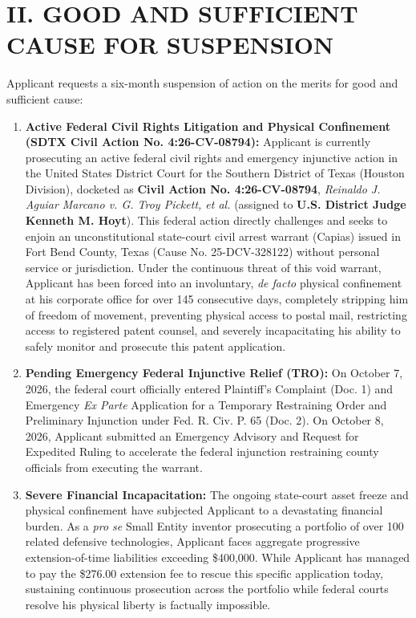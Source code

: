 \documentclass[11pt,letterpaper]{article}
\begin{document}
\section*{II. GOOD AND SUFFICIENT CAUSE FOR SUSPENSION}

Applicant requests a six-month suspension of action on the merits for good and sufficient cause:

\begin{enumerate}[leftmargin=2em, itemsep=3pt, parsep=0pt]
    \item \textbf{Active Federal Civil Rights Litigation and Physical Confinement (SDTX Civil Action No. 4:26-CV-08794):} Applicant is currently prosecuting an active federal civil rights and emergency injunctive action in the United States District Court for the Southern District of Texas (Houston Division), docketed as \textbf{Civil Action No. 4:26-CV-08794}, \textit{Reinaldo J. Aguiar Marcano v. G. Troy Pickett, et al.} (assigned to \textbf{U.S. District Judge Kenneth M. Hoyt}). This federal action directly challenges and seeks to enjoin an unconstitutional state-court civil arrest warrant (Capias) issued in Fort Bend County, Texas (Cause No. 25-DCV-328122) without personal service or jurisdiction. Under the continuous threat of this void warrant, Applicant has been forced into an involuntary, \textit{de facto} physical confinement at his corporate office for over 145 consecutive days, completely stripping him of freedom of movement, preventing physical access to postal mail, restricting access to registered patent counsel, and severely incapacitating his ability to safely monitor and prosecute this patent application.
    \item \textbf{Pending Emergency Federal Injunctive Relief (TRO):} On October 7, 2026, the federal court officially entered Plaintiff's Complaint (Doc. 1) and Emergency \textit{Ex Parte} Application for a Temporary Restraining Order and Preliminary Injunction under Fed. R. Civ. P. 65 (Doc. 2). On October 8, 2026, Applicant submitted an Emergency Advisory and Request for Expedited Ruling to accelerate the federal injunction restraining county officials from executing the warrant.
    \item \textbf{Severe Financial Incapacitation:} The ongoing state-court asset freeze and physical confinement have subjected Applicant to a devastating financial burden. As a \textit{pro se} Small Entity inventor prosecuting a portfolio of over 100 related defensive technologies, Applicant faces aggregate progressive extension-of-time liabilities exceeding \$400,000. While Applicant has managed to pay the \$276.00 extension fee to rescue this specific application today, sustaining continuous prosecution across the portfolio while federal courts resolve his physical liberty is factually impossible.
\end{enumerate}
\end{document}
